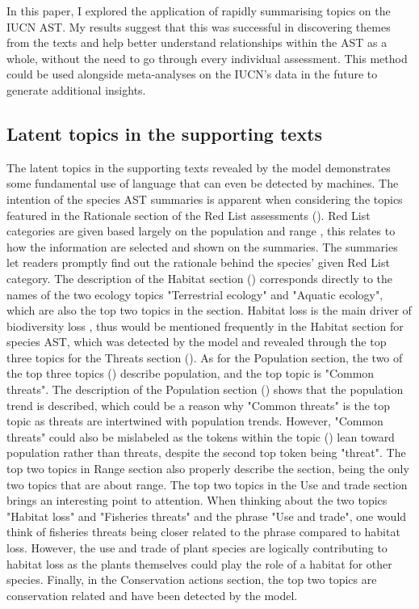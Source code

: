 
In this paper, I explored the application of rapidly summarising topics on the IUCN AST. My results suggest that this was successful in discovering themes from the texts and help better understand relationships within the AST as a whole, without the need to go through every individual assessment. This method could be used alongside meta-analyses on the IUCN's data in the future to generate additional insights.


\subsection{Latent topics in the supporting texts}

The latent topics in the supporting texts revealed by the model demonstrates some fundamental use of language that can even be detected by machines. The intention of the species AST summaries is apparent when considering the topics featured in the Rationale section of the Red List assessments (). Red List categories are given based largely on the population and range \parencite{iucn2012}, this relates to how the information are selected and shown on the summaries. The summaries let readers promptly find out the rationale behind the species' given Red List category. The description of the Habitat section () corresponds directly to the names of the two ecology topics "Terrestrial ecology" and "Aquatic ecology", which are also the top two topics in the section. Habitat loss is the main driver of biodiversity loss \parencite{diaz2019pervasive, pimm2014biodiversity}, thus would be mentioned frequently in the Habitat section for species AST, which was detected by the model and revealed through the top three topics for the Threats section (). As for the Population section, the two of the top three topics () describe population, and the top topic is "Common threats". The description of the Population section () shows that the population trend is described, which could be a reason why "Common threats" is the top topic as threats are intertwined with population trends. However, "Common threats" could also be mislabeled as the tokens within the topic () lean toward population rather than threats, despite the second top token being "threat". The top two topics in Range section also properly describe the section, being the only two topics that are about range. The top two topics in the Use and trade section brings an interesting point to attention. When thinking about the two topics "Habitat loss" and "Fisheries threats" and the phrase "Use and trade", one would think of fisheries threats being closer related to the phrase compared to habitat loss. However, the use and trade of plant species are logically contributing to habitat loss as the plants themselves could play the role of a habitat for other species. Finally, in the Conservation actions section, the top two topics are conservation related and have been detected by the model.

